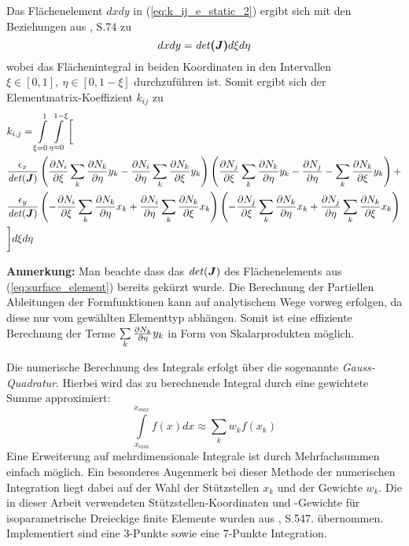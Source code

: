 Das Flächenelement $dxdy$ in (\ref{eq:k_ij_e_static_2}) ergibt sich mit den Beziehungen aus \cite{SMS_VO_skript}, S.74 zu 
\begin{equation}
\label{eq:surface_element}
dxdy = \mathit{det} \boldsymbol{(J)} d\xi d\eta
\end{equation}
wobei das Flächenintegral in beiden Koordinaten in den Intervallen $\xi \in [0,1], \ \eta \in [0, 1-\xi]$ durchzuführen ist. Somit ergibt sich der Elementmatrix-Koeffizient $k_{ij}$ zu 
\begin{align}
&k_{i,j} = \int\displaylimits_{\xi = 0}^{1} \int\displaylimits_{\eta = 0}^{1 - \xi} \bigg[\\
%
&\frac{\epsilon_x}{\mathit{det}(\mat{J})}\left(\parDiff{N_i}{\xi}\sum\limits_{k}\parDiff{N_k}{\eta}y_k - \parDiff{N_i}{\eta}\sum\limits_{k}\parDiff{N_k}{\xi}y_k\right)
%
\left(\parDiff{N_j}{\xi}\sum\limits_{k}\parDiff{N_k}{\eta}y_k - \parDiff{N_j}{\eta} -\sum\limits_{k}\parDiff{N_k}{\xi}y_k\right) + \nonumber\\ 
%
&\frac{\epsilon_y}{\mathit{det}(\mat{J})}\left(-\parDiff{N_i}{\xi}\sum\limits_{k}\parDiff{N_k}{\eta}x_k + \parDiff{N_i}{\eta} \sum\limits_{k}\parDiff{N_k}{\xi}x_k\right)
%
\left(-\parDiff{N_j}{\xi}\sum\limits_{k}\parDiff{N_k}{\eta}x_k + \parDiff{N_j}{\eta} \sum\limits_{k}\parDiff{N_k}{\xi}x_k\right) \nonumber\\ 
& \bigg]d\xi d\eta
\end{align}

\textbf{Anmerkung:} Man beachte dass das $\mathit{det}(\boldsymbol{J})$ des Flächenelements aus (\ref{eq:surface_element}) bereits gekürzt wurde.\newline
Die Berechnung der Partiellen Ableitungen der Formfunktionen kann auf analytischem Wege vorweg erfolgen, da diese nur vom gewählten Elementtyp abhängen. Somit ist eine effiziente Berechnung der Terme $\sum\limits_{k}\frac{\partial N_k}{\partial \eta}y_k$ in Form von Skalarprodukten möglich.\newline

Die numerische Berechnung des Integrals erfolgt über die sogenannte \textit{Gauss-Quadratur}. Hierbei wird das zu berechnende Integral durch eine gewichtete Summe approximiert:
\begin{equation}
\int\limits_{x_{min}}^{x_{max}} f(x) dx \approx \sum\limits_{k}w_kf(x_k)
\end{equation}
Eine Erweiterung auf mehrdimensionale Integrale ist durch Mehrfachsummen einfach möglich. Ein besonderes Augenmerk bei dieser Methode der numerischen Integration liegt dabei auf der Wahl der Stützstellen $x_k$ und der Gewichte $w_k$. Die in dieser Arbeit verwendeten Stützstellen-Koordinaten und -Gewichte für isoparametrische Dreieckige finite Elemente wurden aus \cite{bathe}, S.547. übernommen. Implementiert sind eine 3-Punkte sowie eine 7-Punkte Integration.\newline

